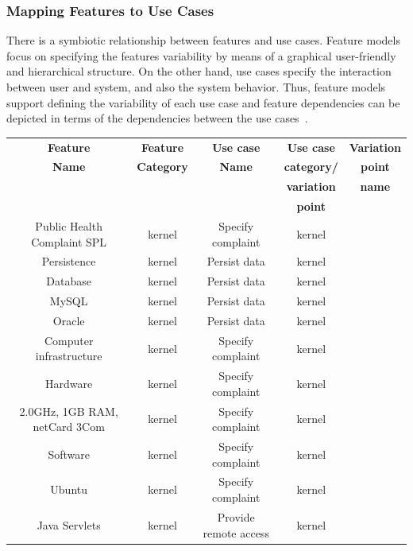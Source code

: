 \documentclass[11pt,twoside]{article}
\begin{document}
\subsubsection{Mapping Features to Use Cases}
There is a symbiotic relationship between features and use cases. Feature models focus on specifying the features variability by means of
a graphical user-friendly and hierarchical structure. On the other hand, use cases specify the interaction between user and system, and
also the system behavior. Thus, feature models support defining the variability of each use case and feature dependencies can be depicted in
terms of the dependencies between the use cases~\cite[Chapter 5.3.2]{Gomaa:2004:DSP}. 


\begin{center}
\begin{footnotesize}
\begin{tabular}{c|c|c|c|c} \hline
\textbf{Feature} & \textbf{Feature}  & \textbf{Use case}  & \textbf{Use case}  & \textbf{Variation} \\
\textbf{Name}    & \textbf{Category} & \textbf{Name}      & \textbf{category/}& \textbf{point} \\ 
                 &                   &                    &\textbf{variation} & \textbf{name} \\ 
        &          &           & \textbf{point} &  \\ \hline
Public Health Complaint SPL & kernel & Specify complaint& kernel & \\  \hline
Persistence & kernel & Persist data & kernel & \\  \hline
Database & kernel & Persist data & kernel & \\  \hline
MySQL & kernel & Persist data  & kernel  & \\  \hline
Oracle & kernel & Persist data  & kernel & \\  \hline
Computer infrastructure & kernel & Specify complaint& kernel & \\  \hline
Hardware & kernel & Specify complaint& kernel & \\  \hline
2.0GHz, 1GB RAM, netCard 3Com & kernel & Specify complaint& kernel & \\  \hline
Software & kernel & Specify complaint & kernel & \\  \hline
Ubuntu & kernel & Specify complaint & kernel & \\  \hline
Java Servlets & kernel & Provide remote access & kernel & \\  \hline

\end{tabular}
\end{footnotesize}
\end{center}
\end{document}
